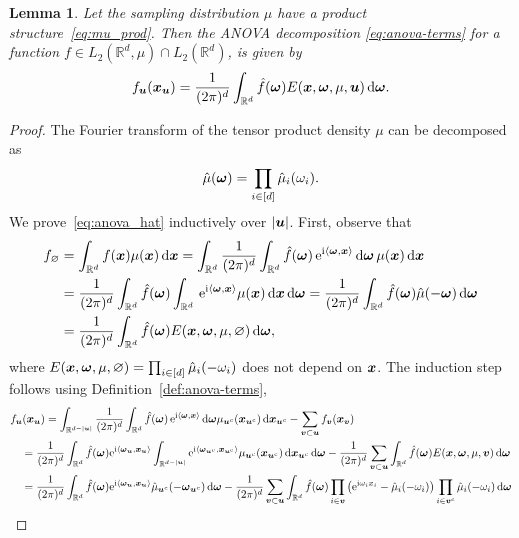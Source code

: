 \documentclass{article}
\renewcommand{\vec}[1]{\ensuremath \mathbf{\boldsymbol{#1}}}
\newcommand{\w}{\ensuremath{\vec \omega}}
\newcommand{\x}{\ensuremath{\vec x}}
\newcommand{\R}{\ensuremath{\mathbb{R}}}
\newcommand{\e}{\mathrm{e}}
\newcommand{\im}{\mathrm{i}}
\renewcommand{\d}{\, \mathrm{d}}
\newtheorem{lemma}[theorem]{Lemma}
\theoremstyle{definition}
\numberwithin{equation}{section}
\begin{document}
\begin{lemma}\label{lem:ANOVA-terms_f}
Let the sampling distribution $\mu$ have a product structure~\eqref{eq:mu_prod}. Then the ANOVA decomposition \eqref{eq:anova-terms} for a function $f\in L_2(\R^d,\mu) \cap L_2(\R^d)$, is given by
\begin{equation}\label{eq:anova_hat}
f_{\vec u}(\vec x_{\vec u}) 
= \frac{1}{(2\pi)^d}\int_{\R^d} \hat f(\w)E(\x,\w,\mu, \vec u)   \d \w.
\end{equation}



\end{lemma}
\begin{proof}
The Fourier transform of the tensor product density $\mu$ can be decomposed as 
\begin{equation*}
\hat{\mu} (\w) = \prod_{i\in [d]} \hat{\mu}_i(\omega_i).
\end{equation*} 
We prove~\eqref{eq:anova_hat} inductively over $|\vec u|$. First, observe that
\begin{align*}
f_\varnothing &= \int_{\R^d} f(\vec x) \mu(\x) \d \vec x 
= \int_{\R^d}\frac{1}{(2\pi)^d}\int_{\R^d}\hat f(\w)\, \e^{\im \langle \w,\vec x\rangle} \d \w\,\mu(\x) \d \vec x\\
&=\frac{1}{(2\pi)^d}\int_{\R^d}\hat f(\w)\int_{\R^d}\, \e^{\im \langle \w,\vec x\rangle} \mu(\x) \d \x\d \w 
=\frac{1}{(2\pi)^d}\int_{\R^d}\hat f(\w) \hat{\mu}(-\w)\d \w \\
&= \frac{1}{(2\pi)^d}\int_{\R^d}\hat f(\w) E(\x,\w,\mu, \varnothing)\d \w,
\end{align*}
where $E(\x,\w,\mu, \varnothing) = \prod_{i\in [d]} \hat{\mu}_i(-\omega_i)$ does not depend on $\x$.
The induction step follows using Definition~\ref{def:anova-terms},
\begin{align*}
&f_{\vec u}(\vec x_{\vec u})
=\int_{\R^{d-|\vec u|}}\frac{1}{(2\pi)^d}\int_{\R^d}\hat f(\w)\, \e^{\im \langle \w,\vec x\rangle} \d \w \mu_{\vec u^c}(\vec x_{\vec u^c})\d \vec x_{\vec u^c}-\sum_{\vec v\subset \vec u}f_{\vec v}(\vec x_{\vec v})\\
&\quad=\frac{1}{(2\pi)^d}\int_{\R^d}\hat f(\w)\e^{\im \langle \w_{\vec u},\vec x_{\vec u}\rangle}\int_{\R^{d-|\vec u|}}\e^{\im \langle \w_{\vec u^c},\vec x_{\vec u^c}\rangle}  \mu_{\vec u^c}(\vec x_{\vec u^c})\d \vec x_{\vec u^c}\d \w
-\frac{1}{(2\pi)^d}\sum_{\vec v\subset \vec u}\int_{\R^d} \hat f(\w)E(\x,\w,\mu, \vec v)\d \w\\
&\quad=\frac{1}{(2\pi)^d}\int_{\R^d}\hat f(\w)\e^{\im \langle \w_{\vec u},\vec x_{\vec u}\rangle} \hat{\mu}_{\vec u^c}(-\w_{\vec u^c})\d \w-\frac{1}{(2\pi)^d}\sum_{\vec v\subset \vec u}\int_{\R^d} \hat f(\w) \prod_{i\in \vec v} \left(\e^{\im \omega_i x_i}- \hat{\mu}_i(-\omega_i)\right) \prod_{i \in \vec v^c} \hat{\mu}_i(-\omega_i) \d \w\\

\end{align*}
\end{proof}
\end{document}
